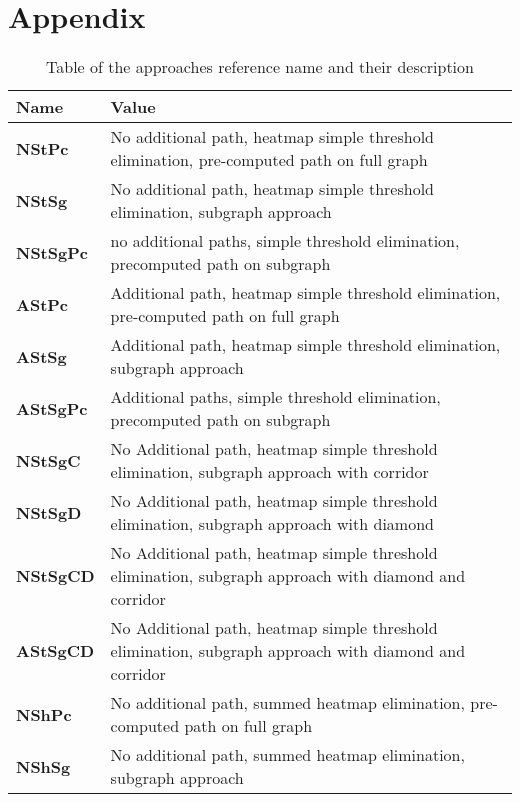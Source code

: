 \section*{Appendix}

\begin{table}[H]
    \begin{center}
    \caption{Table of the approaches reference name and their description}
    \label{tbl:approach_ref_and_desc}
    \begin{tabular}{ | p{2cm} | p{8cm}|  } 
        \hline
        Name & Value \\
        \hline
        \hline
        \textbf{NStPc} & No additional path, heatmap simple threshold elimination, pre-computed path on full graph \\
        \hline
        \textbf{NStSg} & No additional path, heatmap simple threshold elimination, subgraph approach \\
        \hline
        \textbf{NStSgPc} & no additional paths, simple threshold elimination, precomputed path on subgraph \\
        \hline
        \textbf{AStPc} & Additional path, heatmap simple threshold elimination, pre-computed path on full graph \\
        \hline
        \textbf{AStSg} & Additional path, heatmap simple threshold elimination, subgraph approach \\
        \hline
        \textbf{AStSgPc} & Additional paths, simple threshold elimination, precomputed path on subgraph \\
        \hline
        \textbf{NStSgC} & No Additional path, heatmap simple threshold elimination, subgraph approach with corridor \\
        \hline
        \textbf{NStSgD} & No Additional path, heatmap simple threshold elimination, subgraph approach with diamond \\
        \hline
        \textbf{NStSgCD} &  No Additional path, heatmap simple threshold elimination, subgraph approach with diamond and corridor \\
        \hline
        \textbf{AStSgCD} &  No Additional path, heatmap simple threshold elimination, subgraph approach with diamond and corridor \\
        \hline
        \textbf{NShPc} & No additional path, summed heatmap elimination, pre-computed path on full graph \\
        \hline
        \textbf{NShSg} & No additional path, summed heatmap elimination, subgraph approach \\

\end{tabular}
\end{center}
\end{table}
